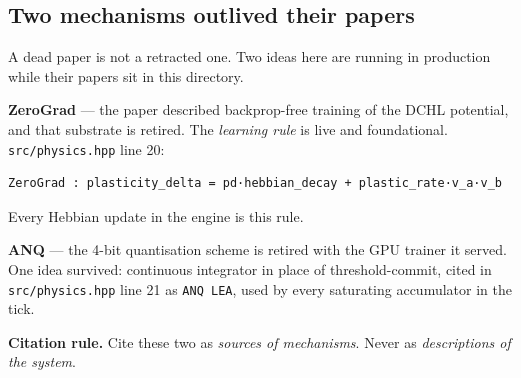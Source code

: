 \documentclass[
  11pt,
  a4paper,
]{article}
\begin{document}
\subsection{Two mechanisms outlived their
papers}\label{two-mechanisms-outlived-their-papers}

A dead paper is not a retracted one. Two ideas here are running in
production while their papers sit in this directory.

\textbf{ZeroGrad} --- the paper described backprop-free training of the
DCHL potential, and that substrate is retired. The \emph{learning rule}
is live and foundational. \texttt{src/physics.hpp} line 20:

\begin{verbatim}
ZeroGrad : plasticity_delta = pd·hebbian_decay + plastic_rate·v_a·v_b
\end{verbatim}

Every Hebbian update in the engine is this rule.

\textbf{ANQ} --- the 4-bit quantisation scheme is retired with the GPU
trainer it served. One idea survived: continuous integrator in place of
threshold-commit, cited in \texttt{src/physics.hpp} line 21 as
\texttt{ANQ\ LEA}, used by every saturating accumulator in the tick.

\textbf{Citation rule.} Cite these two as \emph{sources of mechanisms}.
Never as \emph{descriptions of the system}.
\end{document}
